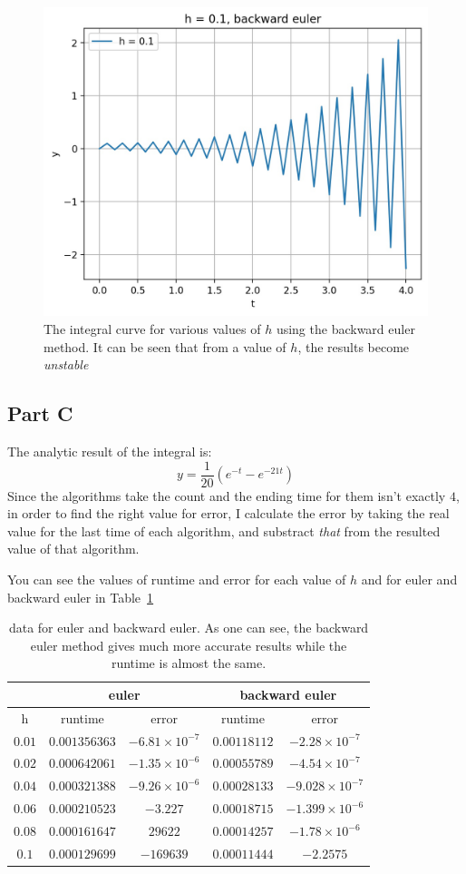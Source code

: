 \documentclass[12pt, a4paper]{article}
\begin{document}
\begin{figure}[h!]
		\includegraphics[width=.45\linewidth]{../p4/results/backward_euler_0.1.jpg}
		\caption{The integral curve for various values of $h$ using the backward euler method. It can be seen that from a value of $h$, the results 
			become \emph{unstable}}
		\label{fig:backward_euler}
	\end{figure}

	\subsection{Part C}
	The analytic result of the integral is:
	\begin{equation}
		y = \frac{1}{20} \left(e^{-t} - e^{-21t}\right)
	\end{equation}
	Since the algorithms take the
	count and the ending time for them isn't exactly $4$, in order to find the right value for error, I calculate the error by taking the real value for the 
	last time of each algorithm, and substract \emph{that} from the resulted value of that algorithm.

	You can see the values of runtime and error for each value of $h$ and for euler and backward euler in Table~\ref{tab:eulers}
	
	\begin{table}[h!]
		\centering
		\begin{tabular}{|c|c|c|c|c|}
\hline
 & \multicolumn{2}{|c|}{euler} & \multicolumn{2}{|c|}{backward euler}\\
\hline
h & runtime & error & runtime & error\\
 \hline
$0.01$ & $0.001356363$ & $-6.81 \times 10 ^{-7}$ & $0.00118112$ & $-2.28\times 10^{-7}$  \\
 \hline
$0.02$ & $0.000642061$ & $-1.35\times 10 ^{-6}$ & $0.00055789$ & $-4.54 \times 10^{-7}$ \\
 \hline
$0.04$ & $0.000321388$ & $-9.26 \times 10 ^{-6}$ & $0.00028133$ & $-9.028 \times 10^{-7}$ \\
 \hline
$0.06$ & $0.000210523$ & $-3.227$ & $0.00018715$ & $-1.399 \times 10^{-6}$ \\
 \hline
$0.08$ &$0.000161647$ & $29622$  & $0.00014257$ & $-1.78 \times 10^{-6}$ \\
 \hline
$0.1$ &$0.000129699$  & $-169639$ & $0.00011444$ & $-2.2575$ \\
\hline
		\end{tabular}
	\caption{data for euler and backward euler. As one can see, the backward euler method gives much more accurate results while the runtime 
	is almost the same.}
	\label{tab:eulers}
	\end{table}
\end{document}
